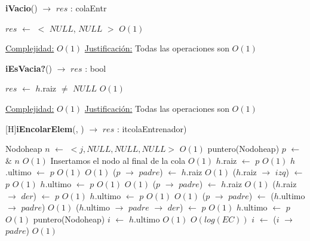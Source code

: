 \begin{Algoritmos}
   
\begin{algorithm}[H]{\textbf{iVacio}() $\to$ $res$ : colaEntr}
    	\begin{algorithmic}[1]
			 \State $res$ $\gets$  $<$ $NULL$, $NULL$ $>$ \Comment $O(1)$

			\medskip
			\Statex \underline{Complejidad:} $O(1)$
			\Statex \underline{Justificaci\'on:} Todas las operaciones son $O(1)$ 
    	\end{algorithmic}
\end{algorithm}
   
\begin{algorithm}[H]{\textbf{iEsVacia?}() $\to$ $res$ : bool}
    	\begin{algorithmic}[1]
			 \State $res$ $\gets$  $h$.raiz $\neq$ $NULL$ \Comment $O(1)$

			\medskip
			\Statex \underline{Complejidad:} $O(1)$
			\Statex \underline{Justificaci\'on:} Todas las operaciones son $O(1)$ 
    	\end{algorithmic}
\end{algorithm}

[H]{\textbf{iEncolarElem}(, ) $\to$ $res$ : itcolaEntrenador)}
    	\begin{algorithmic}[1]
    	\State Nodoheap $n$ $\gets$ $<j, NULL, NULL, NULL>$ \Comment $O(1)$
    	\State puntero(Nodoheap) $p$ $\gets$ $\&$ $n$  \Comment $O(1)$
		 \Comment Insertamos el nodo al final de la cola $O(1)$
    		\State $h$.raiz $\gets$ $p$ \Comment $O(1)$
    		\State $h$.ultimo $\gets$ $p$ \Comment $O(1)$
    	\Else
    		 \Comment $O(1)$
    			\State ($p$ $\rightarrow$ $padre$) $\gets$ $h$.raiz \Comment $O(1)$
    			\State ($h$.raiz $\rightarrow$ $izq$) $\gets$ $p$ \Comment $O(1)$
    			\State $h$.ultimo $\gets$ $p$    \Comment $O(1)$
    		\Else
    			 \Comment $O(1)$
    				\State ($p$ $\rightarrow$ $padre$) $\gets$ $h$.raiz \Comment $O(1)$
    				\State ($h$.raiz $\rightarrow$ $der$) $\gets$ $p$ \Comment $O(1)$
    				\State $h$.ultimo $\gets$ $p$ \Comment $O(1)$
    			\Else
    				 \Comment $O(1)$
    					\State ($p$ $\rightarrow$ $padre$) $\gets$ ($h$.ultimo $\rightarrow$ $padre$) \Comment $O(1)$
    					\State ($h$.ultimo $\rightarrow$ $padre$ $\rightarrow$ $der$) $\gets$ $p$ \Comment $O(1)$
    					\State $h$.ultimo $\gets$ $p$ \Comment $O(1)$
    				\Else
						\State puntero(Nodoheap) $i$ $\gets$ $h$.ultimo	 \Comment $O(1)$	
    					 \Comment $O(log(EC))$
    						\State $i$ $\gets$ ($i$ $\rightarrow$ $padre$) \Comment $O(1)$
    					

\end{algorithmic}
\end{Algoritmos}
